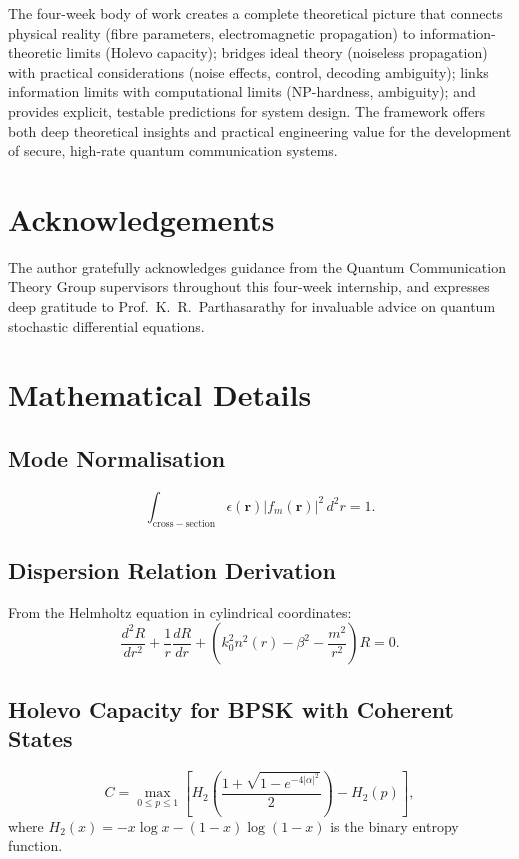 \documentclass[journal,twocolumn]{IEEEtran}
\theoremstyle{definition}
\theoremstyle{plain}
\begin{document}
The four-week body of work creates a complete theoretical picture that
connects physical reality (fibre parameters, electromagnetic
propagation) to information-theoretic limits (Holevo capacity); bridges
ideal theory (noiseless propagation) with practical considerations
(noise effects, control, decoding ambiguity); links information limits
with computational limits (NP-hardness, ambiguity); and provides
explicit, testable predictions for system design. The framework offers
both deep theoretical insights and practical engineering value for the
development of secure, high-rate quantum communication systems.

\section*{Acknowledgements}

The author gratefully acknowledges guidance from the Quantum
Communication Theory Group supervisors throughout this four-week
internship, and expresses deep gratitude to Prof.\ K.\ R.\
Parthasarathy for invaluable advice on quantum stochastic differential
equations.

\appendices

\section{Mathematical Details}

\subsection{Mode Normalisation}
\begin{equation}
  \int_{\mathrm{cross-section}}\epsilon(\mathbf{r})
  |f_m(\mathbf{r})|^2\,d^2r=1.
\end{equation}

\subsection{Dispersion Relation Derivation}
From the Helmholtz equation in cylindrical coordinates:
\begin{equation}
  \frac{d^2R}{dr^2}+\frac{1}{r}\frac{dR}{dr}
  +\left(k_0^2 n^2(r)-\beta^2-\frac{m^2}{r^2}\right)R=0.
\end{equation}

\subsection{Holevo Capacity for BPSK with Coherent States}
\begin{equation}
  C=\max_{0\le p\le1}\!\left[H_2\!\left(
    \frac{1+\sqrt{1-e^{-4|\alpha|^2}}}{2}\right)-H_2(p)\right],
\end{equation}
where $H_2(x)=-x\log x-(1-x)\log(1-x)$ is the binary entropy function.
\end{document}
